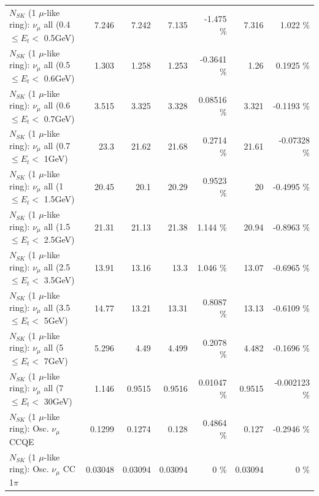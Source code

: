 \begin{table}
\begin{tabular}{| l | r | r | r  r | r  r |}
       $N_{SK}$ (1 $\mu$-like ring): $\nu_{\mu}$ all (0.4 $\leq E_{t} <$ 0.5GeV) &           7.246 &           7.242 &           7.135 &   -1.475 \%  &           7.316 &    1.022 \%  \\ 
       $N_{SK}$ (1 $\mu$-like ring): $\nu_{\mu}$ all (0.5 $\leq E_{t} <$ 0.6GeV) &           1.303 &           1.258 &           1.253 &  -0.3641 \%  &            1.26 &   0.1925 \%  \\ 
       $N_{SK}$ (1 $\mu$-like ring): $\nu_{\mu}$ all (0.6 $\leq E_{t} <$ 0.7GeV) &           3.515 &           3.325 &           3.328 &  0.08516 \%  &           3.321 &  -0.1193 \%  \\ 
         $N_{SK}$ (1 $\mu$-like ring): $\nu_{\mu}$ all (0.7 $\leq E_{t} <$ 1GeV) &            23.3 &           21.62 &           21.68 &   0.2714 \%  &           21.61 & -0.07328 \%  \\ 
         $N_{SK}$ (1 $\mu$-like ring): $\nu_{\mu}$ all (1 $\leq E_{t} <$ 1.5GeV) &           20.45 &            20.1 &           20.29 &   0.9523 \%  &              20 &  -0.4995 \%  \\ 
       $N_{SK}$ (1 $\mu$-like ring): $\nu_{\mu}$ all (1.5 $\leq E_{t} <$ 2.5GeV) &           21.31 &           21.13 &           21.38 &    1.144 \%  &           20.94 &  -0.8963 \%  \\ 
       $N_{SK}$ (1 $\mu$-like ring): $\nu_{\mu}$ all (2.5 $\leq E_{t} <$ 3.5GeV) &           13.91 &           13.16 &            13.3 &    1.046 \%  &           13.07 &  -0.6965 \%  \\ 
         $N_{SK}$ (1 $\mu$-like ring): $\nu_{\mu}$ all (3.5 $\leq E_{t} <$ 5GeV) &           14.77 &           13.21 &           13.31 &   0.8087 \%  &           13.13 &  -0.6109 \%  \\ 
           $N_{SK}$ (1 $\mu$-like ring): $\nu_{\mu}$ all (5 $\leq E_{t} <$ 7GeV) &           5.296 &            4.49 &           4.499 &   0.2078 \%  &           4.482 &  -0.1696 \%  \\ 
          $N_{SK}$ (1 $\mu$-like ring): $\nu_{\mu}$ all (7 $\leq E_{t} <$ 30GeV) &           1.146 &          0.9515 &          0.9516 &  0.01047 \%  &          0.9515 & -0.002123 \%  \\ 
\hline
\hline
                               $N_{SK}$ (1 $\mu$-like ring): Osc. $\nu_\mu$ CCQE &          0.1299 &          0.1274 &           0.128 &   0.4864 \%  &           0.127 &  -0.2946 \%  \\ 
                          $N_{SK}$ (1 $\mu$-like ring): Osc. $\nu_\mu$ CC 1$\pi$ &         0.03048 &         0.03094 &         0.03094 &        0 \%  &         0.03094 &        0 \%  \\ 

\end{tabular}
\end{table}
